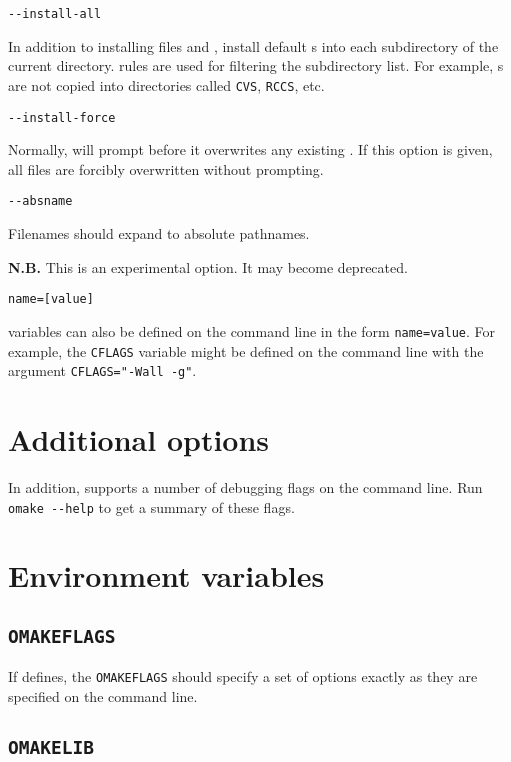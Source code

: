  \verb+--install-all+

In addition to installing files  and , install default
s into each subdirectory of the current directory.   rules are used for
filtering the subdirectory list.  For example, s are not copied into directories
called \verb+CVS+, \verb+RCCS+, etc.

 \verb+--install-force+

Normally,  will prompt before it overwrites any existing .  If this
option is given, all files are forcibly overwritten without prompting.

 \verb+--absname+

Filenames should expand to absolute pathnames.

\textbf{N.B.} This is an experimental option. It may become deprecated.

 \verb+name=[value]+

 variables can also be defined on the command line in the form \verb+name=value+.  For
example, the \verb+CFLAGS+ variable might be defined on the command line with the argument
\verb+CFLAGS="-Wall -g"+.

\section{Additional options}

In addition,  supports a number of debugging flags on the command line. Run
\verb+omake --help+ to get a summary of these flags.

\section{Environment variables}

\subsection{\texttt{OMAKEFLAGS}}

If defines, the \verb+OMAKEFLAGS+ should specify a set of options exactly as they are specified on
the command line.

\subsection{\texttt{OMAKELIB}}

